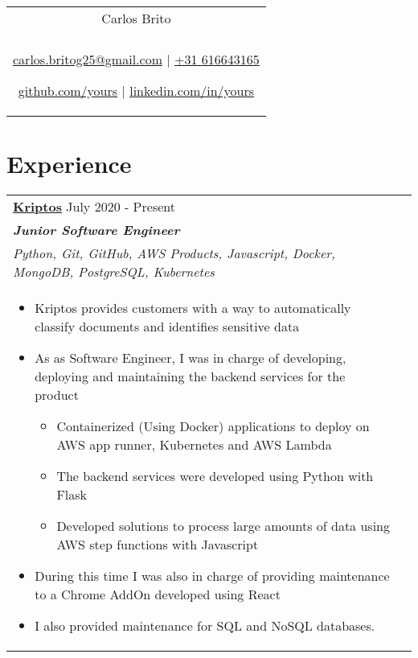 \documentclass[a4paper,8pt]{article}
\begin{document}
\pagestyle{empty} 


\begin{tabularx}{\linewidth}{@{} C @{}}
\color[HTML]{1C033C} \Huge{Carlos Brito} \\[6pt]
\\
\textcolor[HTML]{371e77}{\underline{\href{mailto:your@email.com}{\raisebox{-0.05\height}{\faEnvelope} carlos.britog25@gmail.com}} $|$}
\textcolor[HTML]{371e77}{\href{tel:+525513219900}{\raisebox{-0.05\height}{\faMobile} +31 616643165}}

\textcolor[HTML]{371e77}{\underline{\href{https://github.com/yours}{\raisebox{-0.05\height}{\faGithub} github.com/yours}} $|$}
\textcolor[HTML]{371e77}{\underline{\href{https://linkedin.com/in/yours}{\raisebox{-0.05\height}{\faLinkedin} linkedin.com/in/yours}}}
\end{tabularx}

\section{Experience}
\begin{tabularx}{\linewidth}{ @{}l r@{} }
\textbf{\uline{\href{https://www.kriptos.io/en/home}{Kriptos}}} \hfill \color[HTML]{371e77} July 2020 - Present \\[4pt]
\color[HTML]{371e77}\textbf{\textit{Junior Software Engineer}}\ \hfill \color[HTML]{4B28A4} \\ \textit{Python, Git, GitHub, AWS Products, Javascript, Docker, MongoDB, PostgreSQL, Kubernetes} \\[5pt]
\begin{minipage}[t]{\linewidth}
    \begin{itemize}[nosep,after=\strut, leftmargin=2em, itemsep=2pt]
        \item Kriptos provides customers with a way to automatically classify documents and identifies sensitive data
        \item As as Software Engineer, I was in charge of developing, deploying and maintaining the backend services for the product
        \begin{itemize}[nosep,after=\strut, leftmargin=2em, itemsep=2pt]
            \item Containerized (Using Docker) applications to deploy on AWS app runner, Kubernetes and AWS Lambda
            \item The backend services were developed using Python with Flask
            \item Developed solutions to process large amounts of data using AWS step functions with Javascript
        \end{itemize}
        \item During this time I was also in charge of providing maintenance to a Chrome AddOn developed using React
        \item I also provided maintenance for SQL and NoSQL databases.
    \end{itemize}
\end{minipage}
\end{tabularx}
\end{document}
